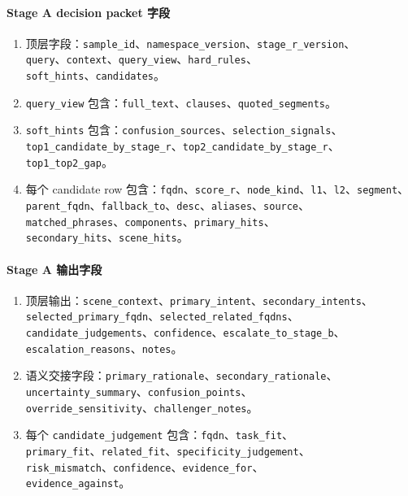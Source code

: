 \documentclass[11pt,a4paper]{ctexart}
\begin{document}
\paragraph{Stage A decision packet 字段}
\begin{enumerate}[leftmargin=1.6em]
\item 顶层字段：\texttt{sample\_id}、\texttt{namespace\_version}、\texttt{stage\_r\_version}、\\
\texttt{query}、\texttt{context}、\texttt{query\_view}、\texttt{hard\_rules}、\\
\texttt{soft\_hints}、\texttt{candidates}。
\item \texttt{query\_view} 包含：\texttt{full\_text}、\texttt{clauses}、\texttt{quoted\_segments}。
\item \texttt{soft\_hints} 包含：\texttt{confusion\_sources}、\texttt{selection\_signals}、\\
\texttt{top1\_candidate\_by\_stage\_r}、\texttt{top2\_candidate\_by\_stage\_r}、\\
\texttt{top1\_top2\_gap}。
\item 每个 candidate row 包含：\texttt{fqdn}、\texttt{score\_r}、\texttt{node\_kind}、\texttt{l1}、\texttt{l2}、\texttt{segment}、\\
\texttt{parent\_fqdn}、\texttt{fallback\_to}、\texttt{desc}、\texttt{aliases}、\texttt{source}、\\
\texttt{matched\_phrases}、\texttt{components}、\texttt{primary\_hits}、\\
\texttt{secondary\_hits}、\texttt{scene\_hits}。
\end{enumerate}

\paragraph{Stage A 输出字段}
\begin{enumerate}[leftmargin=1.6em]
\item 顶层输出：\texttt{scene\_context}、\texttt{primary\_intent}、\texttt{secondary\_intents}、\\
\texttt{selected\_primary\_fqdn}、\texttt{selected\_related\_fqdns}、\\
\texttt{candidate\_judgements}、\texttt{confidence}、\texttt{escalate\_to\_stage\_b}、\\
\texttt{escalation\_reasons}、\texttt{notes}。
\item 语义交接字段：\texttt{primary\_rationale}、\texttt{secondary\_rationale}、\\
\texttt{uncertainty\_summary}、\texttt{confusion\_points}、\\
\texttt{override\_sensitivity}、\texttt{challenger\_notes}。
\item 每个 \texttt{candidate\_judgement} 包含：\texttt{fqdn}、\texttt{task\_fit}、\\
\texttt{primary\_fit}、\texttt{related\_fit}、\texttt{specificity\_judgement}、\\
\texttt{risk\_mismatch}、\texttt{confidence}、\texttt{evidence\_for}、\\
\texttt{evidence\_against}。
\end{enumerate}
\end{document}
